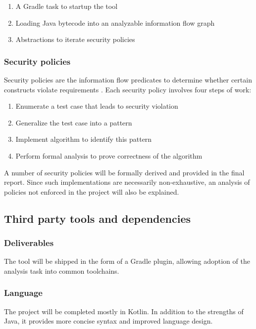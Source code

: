\documentclass[a4paper, 10pt]{article}
\begin{document}
\begin{enumerate}
	\item A Gradle task to startup the tool
	\item Loading Java bytecode into an analyzable information flow graph
	\item Abstractions to iterate security policies
\end{enumerate}

\subsubsection{Security policies}
Security policies are the information flow predicates
to determine whether certain constructs violate requirements \cite{sinha2016design}.
Each security policy involves four steps of work:

\begin{enumerate}
	\item Enumerate a test case that leads to security violation
	\item Generalize the test case into a pattern
	\item Implement algorithm to identify this pattern
	\item Perform formal analysis to prove correctness of the algorithm
\end{enumerate}

A number of security policies will be formally derived
and provided in the final report.
Since such implementations are necessarily non-exhaustive,
an analysis of policies not enforced in the project will also be explained.

\subsection{Third party tools and dependencies}
\subsubsection{Deliverables}
The tool will be shipped in the form of a Gradle plugin,
allowing adoption of the analysis task into common toolchains.

\subsubsection{Language}
The project will be completed mostly in Kotlin.
In addition to the strengths of Java,
it provides more concise syntax and improved language design.
\end{document}
